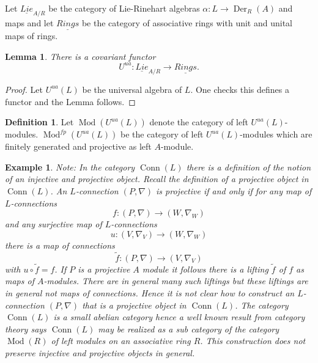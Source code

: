 \documentclass{amsart}
\theoremstyle{plain}
\newtheorem{lemma}[theorem]{Lemma}
\newtheorem{example}[theorem]{Example}
\theoremstyle{definition}
\newtheorem{definition}[theorem]{Definition}
\theoremstyle{remark}
\numberwithin{equation}{theorem}
\begin{document}
Let $\underline{Lie}_{{A}/{R}}$ be the category of Lie-Rinehart algebras $\alpha:L\rightarrow {\operatorname{Der} }_{R}({A})$ and maps
and let $\underline{Rings}$ be the category of associative rings with unit and unital maps of rings.

\begin{lemma} There is a covariant functor
\[{U^{ua}}:\underline{Lie}_{{A}/{R}}\rightarrow \underline{Rings}.\]
\end{lemma}
\begin{proof} Let ${U^{ua}}(L)$ be the universal algebra of $L$. One checks this defines a functor and the Lemma follows.
\end{proof}

\begin{definition}
Let ${\operatorname{Mod}}({U^{ua}}(L))$ denote the category of left ${U^{ua}}(L)$-modules. ${\operatorname{Mod}}^{fp}({U^{ua}}(L))$ be the category of left ${U^{ua}}(L)$-modules
which are finitely generated and projective as left ${A}$-module. 
\end{definition}

\begin{example} 

Note: In the category ${\operatorname{Conn}}(L)$ there is a definition of the notion of an injective and projective object. Recall the
definition of a projective object in ${\operatorname{Conn}}(L)$.
An
$L$-connection $(P,\nabla)$ is \emph{projective} if and only if for any map of $L$-connections
\[ f:(P,\nabla)\rightarrow (W,\nabla_W) \]
and any surjective map of $L$-connections
\[u:(V,\nabla_V)\rightarrow (W,\nabla_W) \]
there is a map of connections
\[\tilde{f}:(P,\nabla)\rightarrow (V,\nabla_V) \]
with $u\circ \tilde{f}=f$. If $P$ is a projective ${A}$ module it follows there is a lifting $\tilde{f}$ of $f$
as maps of ${A}$-modules. There are in general many such liftings but these liftings are in general not maps of connections.
Hence it is not clear
how to construct an $L$-connection $(P, \nabla)$ that is a projective object in ${\operatorname{Conn}}(L)$.
The category ${\operatorname{Conn}}(L)$ is a small abelian category hence a well known result from category theory
says ${\operatorname{Conn}}(L)$ may be realized as a sub category of the category ${\operatorname{Mod}}(R)$ of left modules on an associative
ring $R$. This construction does not preserve injective and projective objects in general.
\end{example}
\end{document}
